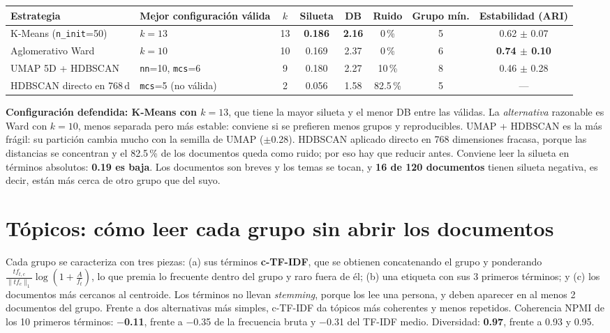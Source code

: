 \documentclass[10pt,a4paper]{article}
\begin{document}
\begin{table}[H]
\centering\footnotesize\setlength{\tabcolsep}{5pt}
\begin{tabular}{@{}llcccccc@{}}
\toprule
\textbf{Estrategia} & \textbf{Mejor configuración válida} & $k$ & \textbf{Silueta} & \textbf{DB} & \textbf{Ruido} & \textbf{Grupo mín.} & \textbf{Estabilidad (ARI)} \\
\midrule
K-Means (\texttt{n\_init}=50)  & $k=13$                          & 13 & \textbf{0.186} & \textbf{2.16} & 0\,\%  & 5 & 0.62 $\pm$ 0.07 \\
Aglomerativo Ward              & $k=10$                          & 10 & 0.169 & 2.37 & 0\,\%  & 6 & \textbf{0.74 $\pm$ 0.10} \\
UMAP 5D + HDBSCAN              & \texttt{nn}=10, \texttt{mcs}=6  &  9 & 0.180 & 2.27 & 10\,\% & 8 & 0.46 $\pm$ 0.28 \\
HDBSCAN directo en 768\,d      & \texttt{mcs}=5 (no válida)      &  2 & 0.056 & 1.58 & 82.5\,\% & 5 & --- \\
\bottomrule
\end{tabular}
\end{table}

\textbf{Configuración defendida: K-Means con $k=13$}, que tiene la mayor silueta y el menor DB entre las
válidas. La \emph{alternativa} razonable es Ward con $k=10$, menos separada pero más estable: conviene si se
prefieren menos grupos y reproducibles. UMAP + HDBSCAN es la más frágil: su partición cambia mucho con la
semilla de UMAP ($\pm$0.28). HDBSCAN aplicado directo en 768 dimensiones fracasa, porque las distancias se
concentran y el 82.5\,\% de los documentos queda como ruido; por eso hay que reducir antes. Conviene leer la
silueta en términos absolutos: \textbf{0.19 es baja}. Los documentos son breves y los temas se tocan, y
\textbf{16 de 120 documentos} tienen silueta negativa, es decir, están más cerca de otro grupo que del suyo.

\section{Tópicos: cómo leer cada grupo sin abrir los documentos}

Cada grupo se caracteriza con tres piezas: (a) sus términos \textbf{c-TF-IDF}, que se obtienen concatenando
el grupo y ponderando $\frac{tf_{t,c}}{\lVert tf_c\rVert_1}\log(1+\frac{A}{f_t})$, lo que premia lo
frecuente dentro del grupo y raro fuera de él; (b) una etiqueta con sus 3 primeros términos; y (c) los
documentos más cercanos al centroide. Los términos no llevan \emph{stemming}, porque los lee una persona, y
deben aparecer en al menos 2 documentos del grupo. Frente a dos alternativas más simples, c-TF-IDF da
tópicos más coherentes y menos repetidos. Coherencia NPMI de los 10 primeros términos: \textbf{$-$0.11},
frente a $-$0.35 de la frecuencia bruta y $-$0.31 del TF-IDF medio. Diversidad: \textbf{0.97}, frente a 0.93
y 0.95.
\end{document}
